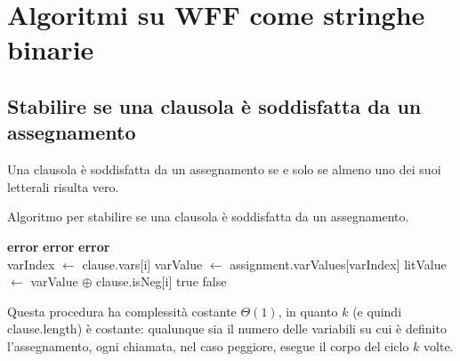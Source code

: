 \chapter{Algoritmi su WFF come stringhe binarie}

\section{Stabilire se una clausola è soddisfatta da un assegnamento}
Una clausola è soddisfatta da un assegnamento se e solo se almeno uno 
dei suoi letterali risulta vero.
\begin{algorithm}[H]
    \caption{Algoritmo per stabilire se una clausola è soddisfatta da un assegnamento.}
    \label{alg:is_clause_sat}
    \begin{algorithmic}[1]
                \State \textbf{error}
            \EndIf
                \State \textbf{error}
            \EndIf
                    \State \textbf{error}
                \EndIf
            \EndFor\\

                \State varIndex $\gets$ clause.vars[i]
                \State varValue $\gets$ assignment.varValues[varIndex]
                \State litValue $\gets$ varValue $\oplus$ clause.isNeg[i]
                    \State \Return true 
                \EndIf
            \EndFor
            \State \Return false
        \EndProcedure
    \end{algorithmic}
\end{algorithm}
Questa procedura ha complessità costante $\Theta(1)$, in quanto $k$ (e quindi clause.length) è costante: qualunque sia il numero 
delle variabili su cui è definito l'assegnamento, ogni chiamata, nel caso peggiore, esegue il 
corpo del ciclo $k$ volte.

